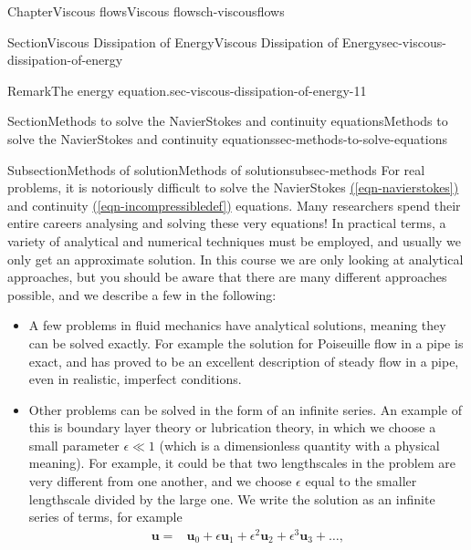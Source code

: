 \documentclass[oneside,10pt,]{book}
\newcommand{\xreffont}{\relax}
\newcommand{\ptxlistdisc}{\raisebox{0.3ex}{\textbullet}}
\numberwithin{equation}{section}
\newcommand{\bu}{\boldsymbol{u}}
\begin{document}
\begin{chapterptx}{Chapter}{Viscous flows}{}{Viscous flows}{}{}{ch-viscousflows}
\begin{sectionptx}{Section}{Viscous Dissipation of Energy}{}{Viscous Dissipation of Energy}{}{}{sec-viscous-dissipation-of-energy}
\begin{remark}{Remark}{The energy equation.}{sec-viscous-dissipation-of-energy-11}
\end{remark}
\end{sectionptx}
%
%
\typeout{************************************************}
\typeout{************************************************}
%
\begin{sectionptx}{Section}{Methods to solve the Navier\textendash{}Stokes and continuity equations}{}{Methods to solve the Navier\textendash{}Stokes and continuity equations}{}{}{sec-methods-to-solve-equations}
%
%
\typeout{************************************************}
\typeout{************************************************}
%
\begin{subsectionptx}{Subsection}{Methods of solution}{}{Methods of solution}{}{}{subsec-methods}
For real problems, it is notoriously difficult to solve the Navier\textendash{}Stokes \hyperref[eqn-navierstokes]{({\xreffont\ref{eqn-navierstokes}})} and continuity \hyperref[eqn-incompressibledef]{({\xreffont\ref{eqn-incompressibledef}})} equations. Many researchers spend their entire careers analysing and solving these very equations! In practical terms, a variety of analytical and numerical techniques must be employed, and usually we only get an approximate solution. In this course we are only looking at analytical approaches, but you should be aware that there are many different approaches possible, and we describe a few in the following:%
\par
%
\begin{itemize}[label=\ptxlistdisc]
\item{}A few problems in fluid mechanics have analytical solutions, meaning they can be solved exactly. For example the solution for Poiseuille flow in a pipe is exact, and has proved to be an excellent description of steady flow in a pipe, even in realistic, imperfect conditions.%
\item{}Other problems can be solved in the form of an infinite series. An example of this is boundary layer theory or lubrication theory, in which we choose a small parameter \(\epsilon\ll1\) (which is a dimensionless quantity with a physical meaning). For example, it could be that two lengthscales in the problem are very different from one another, and we choose \(\epsilon\) equal to the smaller lengthscale divided by the large one. We write the solution as an infinite series of terms, for example%
\begin{align*}
\bu=&\bu_0+\epsilon\bu_1+\epsilon^2\bu_2+\epsilon^3\bu_3+\dots,\\

\end{align*}
\end{itemize}
\end{subsectionptx}
\end{sectionptx}
\end{chapterptx}
\end{document}
